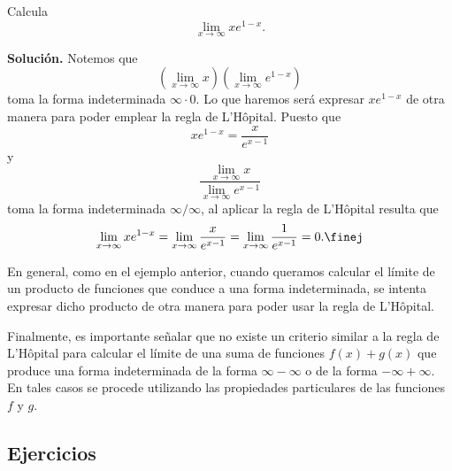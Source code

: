 \documentclass[12pt,a4paper]{book}
\begin{document}
    \begin{ejemplo}\label{ejm:105}
        Calcula
        \begin{equation*}
            \lim_{x\to\infty}xe^{1-x}.
        \end{equation*}

        \textbf{Solución.} Notemos que
        \begin{equation*}
            \left(\lim_{x\to\infty}x\right)\left(\lim_{x\to\infty}e^{1-x}\right)
        \end{equation*}
        toma la forma indeterminada $\infty\cdot 0$. Lo que haremos será expresar $xe^{1-x}$ de
        otra manera para poder emplear la regla de L'Hôpital. Puesto que
        \begin{equation*}
            xe^{1-x}=\frac{x}{e^{x-1}}
        \end{equation*}
        y
        \begin{equation*}
            \frac{\lim_{x\to\infty}x}{\lim_{x\to\infty}e^{x-1}}
        \end{equation*}
        toma la forma indeterminada $\infty/\infty$, al aplicar la regla de L'Hôpital resulta
        que
        \begin{equation*}
            \lim_{x\to\infty}xe^{1-x}=\lim_{x\to\infty}\frac{x}{e^{x-1}}=\lim_{x\to\infty}\frac{1}{e^{x-1}}=0.\finej
        \end{equation*}
    \end{ejemplo}

    En general, como en el ejemplo anterior, cuando queramos calcular el límite
    de un producto de funciones que conduce a una forma indeterminada, se
    intenta expresar dicho producto de otra manera para poder usar la regla de
    L'Hôpital.

    Finalmente, es importante señalar que no existe un criterio similar a la
    regla de L'Hôpital para calcular el límite de una suma de funciones $f(x)+
    g(x)$ que produce una forma indeterminada de la forma $\infty-\infty$ o de la forma
    $-\infty+\infty$. En tales casos se procede utilizando las propiedades particulares
    de las funciones $f$ y $g$.

    \par{}\subsection*{Ejercicios}
\end{document}
